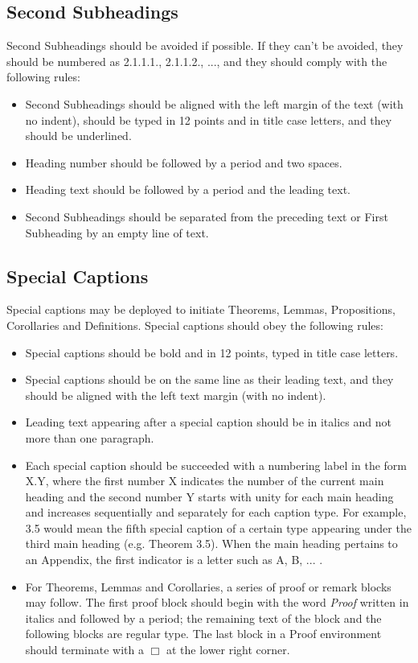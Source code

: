 \documentclass[a4paper,oneside,12pt]{report}
\numberwithin{equation}{chapter}
\begin{document}
\subsection{Second Subheadings}

Second Subheadings should be avoided if possible. If they can't be avoided, they should be numbered as 2.1.1.1., 2.1.1.2., ..., and they should comply with the following rules:
\begin{itemize}
\item Second Subheadings should be aligned with the left margin of the text (with no indent), should be typed in 12 points and in title case letters, and they should be underlined.
\item Heading number should be followed by a period and
two spaces.
\item Heading text should be followed by a period and the leading text.
\item Second Subheadings should be separated from the preceding text or First Subheading by an empty line of text.
\end{itemize}


\subsection {Special Captions}

Special captions may be deployed to initiate Theorems, Lemmas, Propositions, Corollaries and Definitions. Special captions should obey the following rules:
\begin{itemize}
\item Special captions should be bold and in 12 points, typed in title case letters.
\item Special captions should be on the same line as their leading text, and they should be aligned with the left text margin (with no indent).
\item Leading text appearing after a special caption should be in italics and not more than one paragraph.
\item Each special caption should be succeeded with a numbering label in the form X.Y, where the first number X indicates the number of the current main heading and the second number Y starts with unity for each main heading and increases sequentially and separately for each caption type. For example, 3.5 would mean the fifth special caption of a certain type appearing under the third main heading (e.g. Theorem 3.5). When the main heading pertains to an Appendix, the first indicator is a letter such as A, B, ... .
\item For Theorems, Lemmas and Corollaries, a series of proof or remark blocks may follow. The first proof block should begin with the word \textit{Proof} written in italics and followed by a period; the remaining text of the block and the following blocks are regular type. The last block in a Proof environment should terminate with a $\Box$ at the lower right corner.
\end{itemize}
\end{document}
